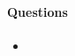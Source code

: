 \documentclass{article}
\begin{document}
\paragraph{Questions}
\begin{itemize}
    \item 
\end{itemize}




% 

\end{document}
